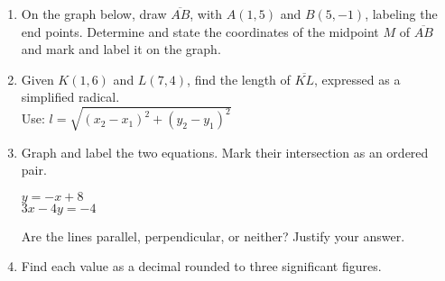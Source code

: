 \begin{enumerate}
\item On the graph below, draw $\overline{AB}$, with $A(1,5)$ and $B(5,-1)$, labeling the end points. Determine and state the coordinates of the midpoint $M$ of $\overline{AB}$ and mark and label it on the graph.
\begin{flushleft}
\end{flushleft}

\item Given $K(1,6)$ and $L(7,4)$, find the length of $\overline{KL}$, expressed as a simplified radical.\\[0.25cm]
Use: $l=\sqrt{(x_2-x_1)^2+(y_2-y_1)^2}$
    \vspace{4cm}

\newpage  
  \item Graph and label the two equations. Mark their intersection as an ordered pair.
  \begin{multicols}{2}
    $y = -x+8$ \\
    $3x-4y = -4$
  \end{multicols}
  Are the lines parallel, perpendicular, or neither? Justify your answer.
  \vspace{1.5cm}
  \begin{center} %
  \end{center}

\item Find each value as a decimal rounded to three significant figures.
  \begin{enumerate}
  \end{enumerate}
  \vspace{0.5cm}


\end{enumerate}
